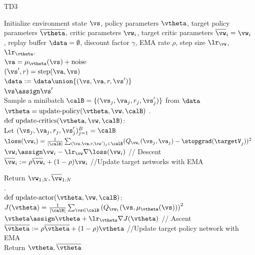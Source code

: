 \begin{algorithm}
\dontprintsemicolon
\caption{TD3}
\label{algo:TD3}
Initialize environment state $\vs$,
policy parameters $\vtheta$,
target policy parameters $\overline{\vtheta}$,
critic parameters $\vw_i$,
target critic parameters $\overline{\vw}_i = \vw_i$,
replay buffer $\data=\emptyset$,
discount factor $\gamma$,
EMA rate $\rho$,
step size $\lr_{\vw}$, $\lr_{\vtheta}$.
\\
       {
         $\va = \mu_{\vtheta}(\vs) + \text{noise}$ \\
         $(\vs',r) = \text{step}(\va, \vs)$ \\
         $\data := \data \union
         \{ (\vs, \va, r, \vs') \}$ \\
         $\vs \assign \vs'$ \\
         Sample a minibatch $\calB = \{(\vs_j,\va_j,r_j,\vs'_j)\}$
         from $\data$\\
         $\vtheta = \text{update-policy}(\vtheta,\vw, \calB)$
        }
.\\
$\text{def update-critics}(\vtheta,\vw,\calB)$: \\
       Let $(\vs_j,\va_j,r_j,\vs'_j)_{j=1}^B = \calB$ \\
    {
      $\loss(\vw_i) = \frac{1}{|\calB|} \sum_{(\vs,\va,r,\vs')_j \in
        \calB} (Q_{\vw_i}(\vs_j,\va_j) - \stopgrad(\targetV_j))^2$\\
      $\vw_i \assign \vw_i - \lr_{\vw} \nabla \loss(\vw_i)$ // Descent
      \\
      $\overline{\vw}_i := \rho \overline{\vw}_i
      + (1-\rho) \vw_i$       //Update target networks with EMA\\
    }

    Return $\vw_{1:N}, \overline{\vw}_{1:N}$\\
.\\
$\text{def update-actor}(\vtheta,\vw,\calB)$: \\
$J(\vtheta) =
 \frac{1}{|\calB|} \sum_{\vs \in \calB}
 \left(Q_{\vw_1}(\vs, \mu_{\vtheta}(\vs)) \right)^2$ \\
 $\vtheta \assign \vtheta +  \lr_{\vtheta} \nabla J(\vtheta)$ //
 Ascent \\
       $\overline{\vtheta} := \rho \overline{\vtheta}
       + (1-\rho) \vtheta$       //Update target policy network with EMA \\
         Return $\vtheta, \overline{\vtheta}$
\end{algorithm}






